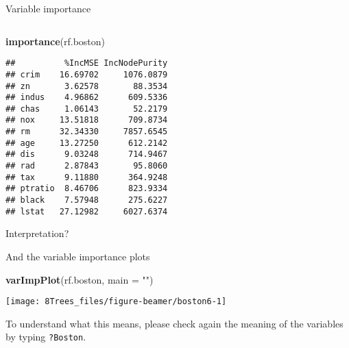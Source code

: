 \documentclass[10pt,ignorenonframetext,]{beamer}
\newenvironment{Shaded}{\begin{snugshade}}{\end{snugshade}}
\newcommand{\DataTypeTok}[1]{\textcolor[rgb]{0.13,0.29,0.53}{#1}}
\newcommand{\KeywordTok}[1]{\textcolor[rgb]{0.13,0.29,0.53}{\textbf{#1}}}
\newcommand{\NormalTok}[1]{#1}
\newcommand{\StringTok}[1]{\textcolor[rgb]{0.31,0.60,0.02}{#1}}
\begin{document}
\begin{frame}[fragile]

\begin{block}{Variable importance}

\(~\)

\scriptsize

\begin{Shaded}
\begin{Highlighting}[]
\KeywordTok{importance}\NormalTok{(rf.boston)}
\end{Highlighting}
\end{Shaded}

\begin{verbatim}
##          %IncMSE IncNodePurity
## crim    16.69702     1076.0879
## zn       3.62578       88.3534
## indus    4.96862      609.5336
## chas     1.06143       52.2179
## nox     13.51818      709.8734
## rm      32.34330     7857.6545
## age     13.27250      612.2142
## dis      9.03248      714.9467
## rad      2.87843       95.8060
## tax      9.11880      364.9248
## ptratio  8.46706      823.9334
## black    7.57948      275.6227
## lstat   27.12982     6027.6374
\end{verbatim}

\normalsize

Interpretation?

\end{block}

\end{frame}

\begin{frame}[fragile]

And the variable importance plots

\scriptsize

\begin{Shaded}
\begin{Highlighting}[]
\KeywordTok{varImpPlot}\NormalTok{(rf.boston, }\DataTypeTok{main =} \StringTok{""}\NormalTok{)}
\end{Highlighting}
\end{Shaded}

\begin{center}\texttt{[image: 8Trees\_files/figure-beamer/boston6-1]} \end{center}

\normalsize

To understand what this means, please check again the meaning of the
variables by typing \texttt{?Boston}.

\end{frame}
\end{document}
